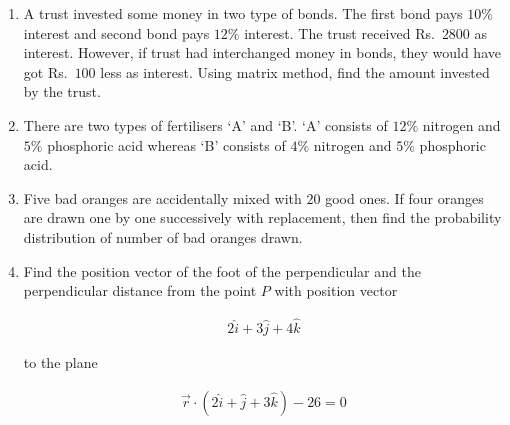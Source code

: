 \documentclass[12pt]{article}
\begin{document}
\begin{enumerate}
\begin{align*}
\sin^{-1}x+\sin^{-1}(1-x)
&=
\cos^{-1}x
\end{align*}

\textbf{OR}

If

\begin{align*}
\cos^{-1}\frac{x}{a}
+
\cos^{-1}\frac{y}{b}
&=
\alpha
\end{align*}

prove that

\begin{align*}
\frac{x^2}{a^2}
-
2\frac{xy}{ab}\cos\alpha
+
\frac{y^2}{b^2}
&=
\sin^2\alpha
\end{align*}

\vspace{0.2cm}

\item[(19)] A trust invested some money in two type of bonds. The first bond pays $10\%$ interest and second bond pays $12\%$ interest. The trust received Rs.\ $2800$ as interest. However, if trust had interchanged money in bonds, they would have got Rs.\ $100$ less as interest. Using matrix method, find the amount invested by the trust.

\vspace{0.2cm}

\item[(20)] There are two types of fertilisers `A' and `B'. `A' consists of $12\%$ nitrogen and $5\%$ phosphoric acid whereas `B' consists of $4\%$ nitrogen and $5\%$ phosphoric acid.

\vspace{0.2cm}

\item[(21)] Five bad oranges are accidentally mixed with $20$ good ones. If four oranges are drawn one by one successively with replacement, then find the probability distribution of number of bad oranges drawn.

\vspace{0.2cm}

\item[(22)] Find the position vector of the foot of the perpendicular and the perpendicular distance from the point $P$ with position vector

\begin{align*}
2\hat{i}+3\hat{j}+4\hat{k}
\end{align*}

to the plane

\begin{align*}
\vec{r}\cdot(2\hat{i}+\hat{j}+3\hat{k})-26=0
\end{align*}


\end{enumerate}
\end{document}

